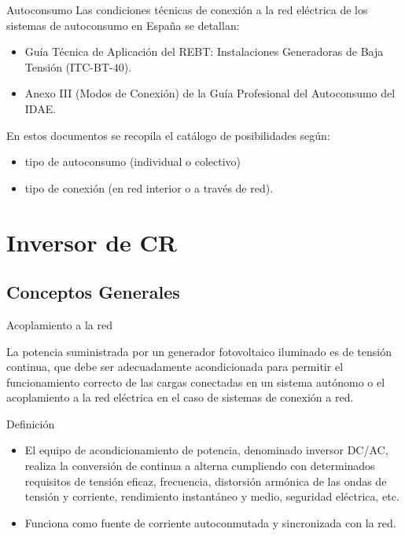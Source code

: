 \documentclass[xcolor={usenames,svgnames,dvipsnames}]{beamer}
\begin{document}
\begin{frame}[label={sec:org98d76f5}]{Autoconsumo}
Las condiciones técnicas de conexión a la red eléctrica de los
sistemas de autoconsumo en España se detallan:

\begin{itemize}
\item Guía Técnica de Aplicación del REBT: Instalaciones Generadoras de Baja Tensión (ITC-BT-40).
\item Anexo III (Modos de Conexión) de la Guía Profesional del Autoconsumo del IDAE.
\end{itemize}

En estos documentos se recopila el catálogo de posibilidades según:
\begin{itemize}
\item tipo de autoconsumo (individual o colectivo)
\item tipo de conexión (en red interior o a través de red).
\end{itemize}
\end{frame}

\section{Inversor de CR}
\label{sec:orgf197068}

\subsection{Conceptos Generales}
\label{sec:org7b406bc}
\begin{frame}[label={sec:org593de2f}]{Acoplamiento a la red}
\begin{block}{}
La potencia suministrada por un generador fotovoltaico iluminado es de
tensión continua, que debe ser adecuadamente acondicionada para permitir
el funcionamiento correcto de las cargas conectadas en un sistema
autónomo o el acoplamiento a la red eléctrica en el caso de sistemas de
conexión a red.
\end{block}
\end{frame}

\begin{frame}[label={sec:orgc931410}]{Definición}
\begin{itemize}
\item El equipo de acondicionamiento de potencia, denominado inversor DC/AC, realiza la \alert{conversión de continua a alterna cumpliendo con  determinados requisitos} de tensión eficaz, frecuencia, distorsión armónica de las ondas de tensión y corriente, rendimiento instantáneo y medio, seguridad eléctrica, etc.

\item Funciona como fuente de corriente autoconmutada y sincronizada con la red.
\end{itemize}
\end{frame}
\end{document}
